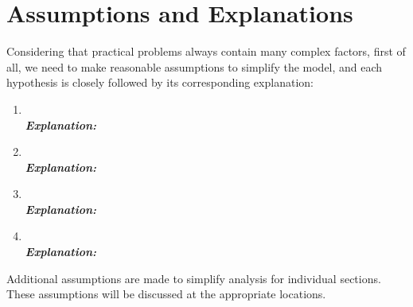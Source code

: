 \documentclass[12pt]{article}  %
\begin{document}
\section{Assumptions and Explanations} %
Considering that practical problems always contain many complex factors, first of all, we need to make reasonable assumptions to simplify the model, and each hypothesis is closely followed by its corresponding explanation:

\begin{enumerate}

	\item \textbf{}\\
	\textbf{\textit{Explanation:}}
	
	
		\item \textbf{}\\
	
		\textbf{\textit{Explanation:}}
		
		
			\item \textbf{}\\
			
			\textbf{\textit{Explanation:}}
			
			
				\item \textbf{}\\
				
				\textbf{\textit{Explanation:}}
\end{enumerate}
Additional assumptions are made to simplify analysis for individual sections. These assumptions will be discussed at the appropriate locations.
\end{document}
